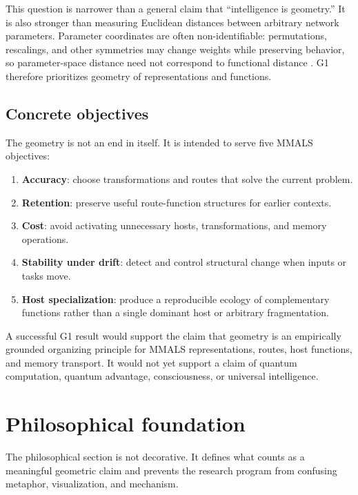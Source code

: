 \documentclass[11pt,a4paper]{article}
\begin{document}
This question is narrower than a general claim that ``intelligence is geometry.'' It is also stronger than measuring Euclidean distances between arbitrary network parameters. Parameter coordinates are often non-identifiable: permutations, rescalings, and other symmetries may change weights while preserving behavior, so parameter-space distance need not correspond to functional distance \citep{dinh2017sharp}. G1 therefore prioritizes geometry of representations and functions.

\subsection{Concrete objectives}

The geometry is not an end in itself. It is intended to serve five MMALS objectives:

\begin{enumerate}[label=\textbf{G\arabic*.}]
\item \textbf{Accuracy}: choose transformations and routes that solve the current problem.
\item \textbf{Retention}: preserve useful route-function structures for earlier contexts.
\item \textbf{Cost}: avoid activating unnecessary hosts, transformations, and memory operations.
\item \textbf{Stability under drift}: detect and control structural change when inputs or tasks move.
\item \textbf{Host specialization}: produce a reproducible ecology of complementary functions rather than a single dominant host or arbitrary fragmentation.
\end{enumerate}

\begin{claimbox}
A successful G1 result would support the claim that geometry is an empirically grounded organizing principle for MMALS representations, routes, host functions, and memory transport. It would not yet support a claim of quantum computation, quantum advantage, consciousness, or universal intelligence.
\end{claimbox}

\section{Philosophical foundation}

The philosophical section is not decorative. It defines what counts as a meaningful geometric claim and prevents the research program from confusing metaphor, visualization, and mechanism.
\end{document}
